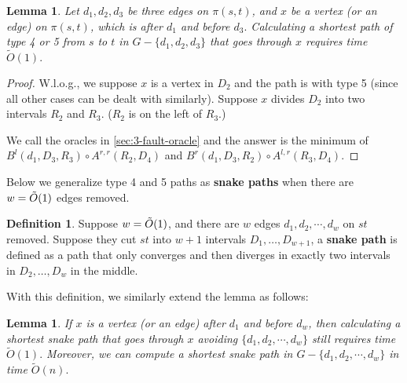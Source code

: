 \documentclass[11pt]{article}
\theoremstyle{plain}
\newtheorem{lemma}[theorem]{Lemma}
\theoremstyle{definition}
\newtheorem{definition}[theorem]{Definition}
\newcommand{\too}[1]{\tilde{O}({#1})}
\begin{document}
\begin{lemma}\label{lemma:snake3}
    Let $d_1,d_2,d_3$ be three edges on $\pi(s,t)$, and $x$ be a vertex (or an edge) on $\pi(s,t)$, which is after $d_1$ and before $d_3.$ Calculating a shortest path of type 4 or 5 from $s$ to $t$ in $G-\{d_1,d_2,d_3\}$ that goes through $x$ requires time $\too{1}.$ 
\end{lemma}

\begin{proof}
    W.l.o.g., we suppose $x$ is a vertex in $D_2$ and the path is with type 5 (since all other cases can be dealt with similarly). Suppose $x$ divides $D_2$ into two intervals $R_2$ and $R_3$. ($R_2$ is on the left of $R_3$.)
    


    We call the oracles in \cref{sec:3-fault-oracle} and the answer is the minimum of $B^l(d_1,D_3,R_3)\circ {A}^{r,r}(R_2,D_4)$ and $B^r(d_1,D_3,R_2)\circ {A}^{l,r}(R_3,D_4)$. 

\end{proof}

Below we generalize type 4 and 5 paths as  \textbf{snake paths} when there are $w=\Tilde{O}(1)$ edges removed.

\begin{definition}

Suppose $w=\Tilde{O}(1)$, and there are $w$ edges $d_1,d_2,\cdots,d_w$ on $st$ removed. Suppose they cut $st$ into $w+1$ intervals $D_1, \dots , D_{w+1}$, a \textbf{snake path} is defined as a path that only converges and then diverges in exactly two intervals in $D_2, \dots, D_w$ in the middle. 

\end{definition}

With this definition, we similarly extend the lemma as follows:



\begin{lemma}\label{lemma:snake}
    If $x$ is a vertex (or an edge) after $d_1$ and before $d_w$, then calculating a shortest snake path that goes through $x$ avoiding $\{d_1,d_2,\cdots,d_w\}$ still requires time $\too{1}.$ Moreover, we can compute a shortest snake path in $G-\{d_1,d_2,\cdots,d_w\}$ in time $\too{n}.$
\end{lemma}
\end{document}
